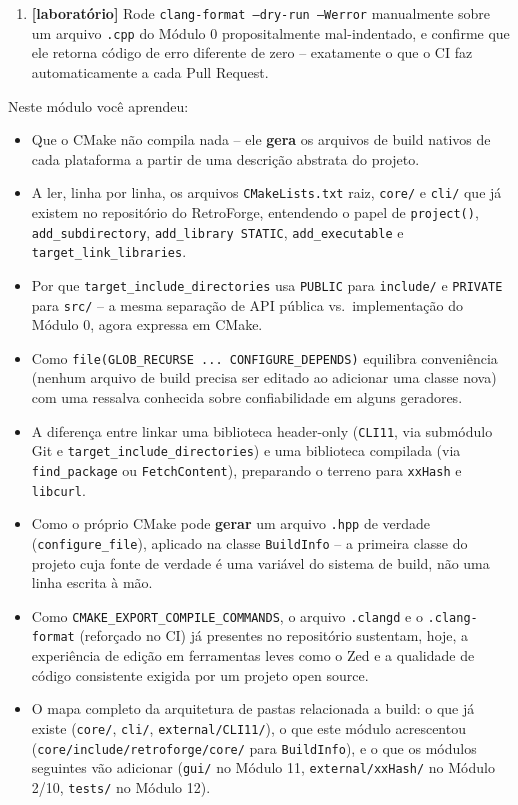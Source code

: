 \begin{CaixaDesafio}
\begin{enumerate}[label=\textbf{1.\arabic*}]
    \item \textbf{[laboratório]} Rode \texttt{clang-format --dry-run --Werror} manualmente sobre um arquivo \texttt{.cpp} do Módulo 0 propositalmente mal-indentado, e confirme que ele retorna código de erro diferente de zero -- exatamente o que o CI faz automaticamente a cada Pull Request.
\end{enumerate}
\end{CaixaDesafio}

\begin{CaixaResumo}
Neste módulo você aprendeu:
\begin{itemize}
    \item Que o CMake não compila nada -- ele \textbf{gera} os arquivos de build nativos de cada plataforma a partir de uma descrição abstrata do projeto.
    \item A ler, linha por linha, os arquivos \texttt{CMakeLists.txt} raiz, \texttt{core/} e \texttt{cli/} que já existem no repositório do RetroForge, entendendo o papel de \texttt{project()}, \texttt{add\_subdirectory}, \texttt{add\_library STATIC}, \texttt{add\_executable} e \texttt{target\_link\_libraries}.
    \item Por que \texttt{target\_include\_directories} usa \texttt{PUBLIC} para \texttt{include/} e \texttt{PRIVATE} para \texttt{src/} -- a mesma separação de API pública vs.\ implementação do Módulo 0, agora expressa em CMake.
    \item Como \texttt{file(GLOB\_RECURSE ... CONFIGURE\_DEPENDS)} equilibra conveniência (nenhum arquivo de build precisa ser editado ao adicionar uma classe nova) com uma ressalva conhecida sobre confiabilidade em alguns geradores.
    \item A diferença entre linkar uma biblioteca header-only (\texttt{CLI11}, via submódulo Git e \texttt{target\_include\_directories}) e uma biblioteca compilada (via \texttt{find\_package} ou \texttt{FetchContent}), preparando o terreno para \texttt{xxHash} e \texttt{libcurl}.
    \item Como o próprio CMake pode \textbf{gerar} um arquivo \texttt{.hpp} de verdade (\texttt{configure\_file}), aplicado na classe \texttt{BuildInfo} -- a primeira classe do projeto cuja fonte de verdade é uma variável do sistema de build, não uma linha escrita à mão.
    \item Como \texttt{CMAKE\_EXPORT\_COMPILE\_COMMANDS}, o arquivo \texttt{.clangd} e o \texttt{.clang-format} (reforçado no CI) já presentes no repositório sustentam, hoje, a experiência de edição em ferramentas leves como o Zed e a qualidade de código consistente exigida por um projeto open source.
    \item O mapa completo da arquitetura de pastas relacionada a build: o que já existe (\texttt{core/}, \texttt{cli/}, \texttt{external/CLI11/}), o que este módulo acrescentou (\texttt{core/include/retroforge/core/} para \texttt{BuildInfo}), e o que os módulos seguintes vão adicionar (\texttt{gui/} no Módulo 11, \texttt{external/xxHash/} no Módulo 2/10, \texttt{tests/} no Módulo 12).
\end{itemize}


\end{CaixaResumo}
